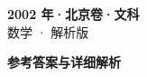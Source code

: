 \documentclass[zihao=-4, a4paper]{ctexart}
\begin{document}
\begin{center}
  {\Large\bfseries 2002 年·北京卷·文科}\\[4pt]
  {\large 数学 · 解析版}
\end{center}
\medskip
{}

\clearpage
{}
\begin{center}{\Large\bfseries 参考答案与详细解析}\end{center}
\medskip

\end{document}
